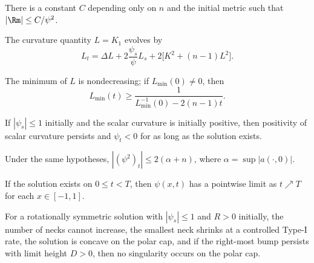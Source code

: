 \begin{corollary}
\label{ch02-cor-neckpinch-curvature-radius}
There is a constant \(C\) depending only on \(n\) and the initial metric such
that \(|\Rm|\le C/\psi^2\).
\end{corollary}

\begin{lemma}
\label{ch02-lem-neckpinch-L-evolution}
The curvature quantity \(L=K_1\) evolves by
\[
L_t=\Delta L+2\frac{\psi_s}{\psi}L_s+2\bigl[K^2+(n-1)L^2\bigr].
\]
\end{lemma}

\begin{corollary}
\label{ch02-cor-neckpinch-Lmin}
The minimum of \(L\) is nondecreasing; if \(L_{\min}(0)\neq 0\), then
\[
L_{\min}(t)\ge \frac{1}{L_{\min}^{-1}(0)-2(n-1)t}.
\]
\end{corollary}

\begin{lemma}
\label{ch02-lem-neckpinch-shrinking-radius}
If \(|\psi_s|\le 1\) initially and the scalar curvature is initially positive,
then positivity of scalar curvature persists and \(\psi_t<0\) for as long as
the solution exists.
\end{lemma}

\begin{lemma}
\label{ch02-lem-neckpinch-lipschitz}
Under the same hypotheses, \(|(\psi^2)_t|\le 2(\alpha+n)\), where
\(\alpha=\sup|a(\cdot,0)|\).
\end{lemma}

\begin{corollary}
\label{ch02-cor-neckpinch-limit-profile}
If the solution exists on \(0\le t<T\), then \(\psi(x,t)\) has a pointwise
limit as \(t\nearrow T\) for each \(x\in[-1,1]\).
\end{corollary}

\begin{proposition}
\label{ch02-prop-neckpinch-profile}
For a rotationally symmetric solution with \(|\psi_s|\le 1\) and \(R>0\)
initially, the number of necks cannot increase, the smallest neck shrinks at a
controlled Type-I rate, the solution is concave on the polar cap, and if the
right-most bump persists with limit height \(D>0\), then no singularity occurs
on the polar cap.
\end{proposition}


